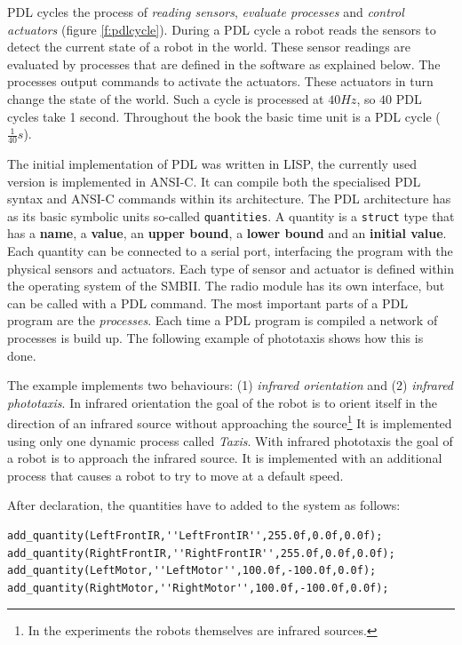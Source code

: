 PDL cycles the process of {\em reading sensors}, {\em evaluate processes} and {\em control actuators} (figure \ref{f:pdlcycle}). During a PDL cycle a robot reads the sensors to detect the current state of a robot in the world. These sensor readings are evaluated by processes that are defined in the software as explained below. The processes output commands to activate the actuators. These actuators in turn change the state of the world. Such a cycle is processed at $40 Hz$, so $40$ PDL cycles take 1 second. Throughout the book the basic time unit is a PDL cycle ($\frac{1}{40} s$).

The initial implementation of PDL was written in LISP, the currently used version is implemented in ANSI-C. It can compile both the specialised PDL syntax and ANSI-C commands within its architecture. The PDL architecture has as its basic symbolic units so-called \texttt{quantities}. A quantity is a \texttt{struct} type that has a {\bf name}, a {\bf value}, an {\bf upper bound}, a {\bf lower bound} and an {\bf initial value}. Each quantity can be connected to a serial port, interfacing the program with the physical sensors and actuators. Each type of sensor and actuator is defined within the operating system of the SMBII. The radio module has its own interface, but can be called with a PDL command. The most important parts of a PDL program are the {\em processes}. Each time a PDL program is compiled a network of processes is build up. The following example of phototaxis shows how this is done.



The example implements two behaviours: (1) {\em infrared orientation} and (2) {\em infrared phototaxis}. In infrared orientation the goal of the robot is to orient itself in the direction of an infrared source without approaching the source\footnote{In the experiments the robots themselves are infrared sources.} It is implemented using only one dynamic process called {\em Taxis}. With infrared phototaxis the goal of a robot is to approach the infrared source. It is implemented with an additional process that causes a robot to try to move at a default speed. 


After declaration, the quantities have to added to the system as follows:


{\footnotesize\begin{verbatim}
add_quantity(LeftFrontIR,''LeftFrontIR'',255.0f,0.0f,0.0f);
add_quantity(RightFrontIR,''RightFrontIR'',255.0f,0.0f,0.0f);
add_quantity(LeftMotor,''LeftMotor'',100.0f,-100.0f,0.0f);
add_quantity(RightMotor,''RightMotor'',100.0f,-100.0f,0.0f);
\end{verbatim}}

